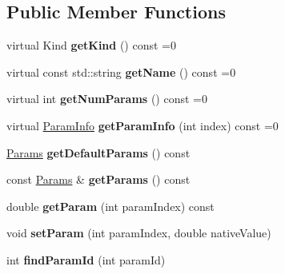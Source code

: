 \subsection*{Public Member Functions}
\begin{DoxyCompactItemize}
\item 
\hypertarget{classDsp_1_1Filter_a2adea5722343fe7baef83675c93007b7}{virtual Kind {\bfseries get\-Kind} () const =0}\label{classDsp_1_1Filter_a2adea5722343fe7baef83675c93007b7}

\item 
\hypertarget{classDsp_1_1Filter_ab540edd397ad430265adeccdb438a220}{virtual const std\-::string {\bfseries get\-Name} () const =0}\label{classDsp_1_1Filter_ab540edd397ad430265adeccdb438a220}

\item 
\hypertarget{classDsp_1_1Filter_adc6686fa1c9c416e124122379bbeaa04}{virtual int {\bfseries get\-Num\-Params} () const =0}\label{classDsp_1_1Filter_adc6686fa1c9c416e124122379bbeaa04}

\item 
\hypertarget{classDsp_1_1Filter_a22a4a3acb7a1971ceec562b8401eebfd}{virtual \hyperlink{classDsp_1_1ParamInfo}{Param\-Info} {\bfseries get\-Param\-Info} (int index) const =0}\label{classDsp_1_1Filter_a22a4a3acb7a1971ceec562b8401eebfd}

\item 
\hypertarget{classDsp_1_1Filter_a707b036513a6917c920b04482dd4842d}{\hyperlink{structDsp_1_1Params}{Params} {\bfseries get\-Default\-Params} () const }\label{classDsp_1_1Filter_a707b036513a6917c920b04482dd4842d}

\item 
\hypertarget{classDsp_1_1Filter_a6212ef3c29e0d6b2d4875b52c1289e47}{const \hyperlink{structDsp_1_1Params}{Params} \& {\bfseries get\-Params} () const }\label{classDsp_1_1Filter_a6212ef3c29e0d6b2d4875b52c1289e47}

\item 
\hypertarget{classDsp_1_1Filter_a7a99ae4cef0da87fa8e7f6f513879665}{double {\bfseries get\-Param} (int param\-Index) const }\label{classDsp_1_1Filter_a7a99ae4cef0da87fa8e7f6f513879665}

\item 
\hypertarget{classDsp_1_1Filter_a7c5ff4e22f3da3a969b824ada6021608}{void {\bfseries set\-Param} (int param\-Index, double native\-Value)}\label{classDsp_1_1Filter_a7c5ff4e22f3da3a969b824ada6021608}

\item 
\hypertarget{classDsp_1_1Filter_a66da298e3a616496205da8bf71cf3445}{int {\bfseries find\-Param\-Id} (int param\-Id)}\label{classDsp_1_1Filter_a66da298e3a616496205da8bf71cf3445}


\end{DoxyCompactItemize}
